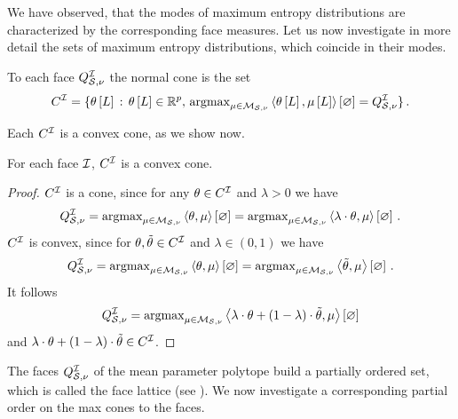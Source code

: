 
We have observed, that the modes of maximum entropy distributions are characterized by the corresponding face measures.
Let us now investigate in more detail the sets of maximum entropy distributions, which coincide in their modes.

\begin{definition}
    To each face $Q^{\mathcal{I}}_{\mathcal{S},\nu}$ the normal cone is the set %
    \begin{align*}
        C^{\mathcal{I}} = \{\theta\left[L\right]\,:\,\theta\left[L\right]\in\mathbb{R}^{p},\,\mathrm{argmax}_{\mu\in\mathcal{M}_{\mathcal{S},\nu}}\left\langle \theta\left[L\right],\mu\left[L\right]\right\rangle \left[ \varnothing \right]=Q^{\mathcal{I}}_{\mathcal{S},\nu}\} \, .
    \end{align*}
\end{definition}

Each $C^{\mathcal{I}}$ is a convex cone, as we show now.

\begin{lemma}
    For each face $\mathcal{I}$, $C^{\mathcal{I}}$ is a convex cone.
\end{lemma}
\begin{proof}
    $C^{\mathcal{I}}$ is a cone, since for any $\theta\in C^{\mathcal{I}}$ and $\lambda>0$ we have
    \begin{align*}
        Q^{\mathcal{I}}_{\mathcal{S},\nu} = \mathrm{argmax}_{\mu\in\mathcal{M}_{\mathcal{S},\nu}} \left\langle \theta,\mu\right\rangle \left[ \varnothing \right] = \mathrm{argmax}_{\mu\in\mathcal{M}_{\mathcal{S},\nu}} \left\langle \lambda\cdot\theta,\mu\right\rangle \left[ \varnothing \right] \, .
    \end{align*}
    $C^{\mathcal{I}}$ is convex, since for $\theta,\tilde{\theta}\in C^{\mathcal{I}}$ and $\lambda\in(0,1)$ we have
    \begin{align*}
        Q^{\mathcal{I}}_{\mathcal{S},\nu} = \mathrm{argmax}_{\mu\in\mathcal{M}_{\mathcal{S},\nu}} \left\langle \theta,\mu\right\rangle \left[ \varnothing \right] = \mathrm{argmax}_{\mu\in\mathcal{M}_{\mathcal{S},\nu}} \left\langle \tilde{\theta},\mu\right\rangle \left[ \varnothing \right] \, .
    \end{align*}
    It follows
    \begin{align*}
        Q^{\mathcal{I}}_{\mathcal{S},\nu} = \mathrm{argmax}_{\mu\in\mathcal{M}_{\mathcal{S},\nu}} \left\langle \lambda\cdot\theta+(1-\lambda)\cdot\tilde{\theta},\mu\right\rangle \left[ \varnothing \right]
    \end{align*}
    and $\lambda\cdot\theta+(1-\lambda)\cdot\tilde{\theta} \in C^{\mathcal{I}}$.
\end{proof}

The faces $Q^{\mathcal{I}}_{\mathcal{S},\nu}$ of the mean parameter polytope build a partially ordered set, which is called the face lattice (see \cite{ziegler_lectures_2013}).
We now investigate a corresponding partial order on the max cones to the faces.

